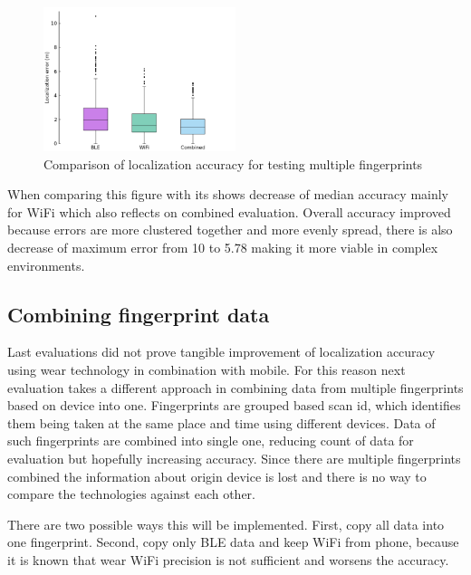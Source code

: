 \begin{figure}[h!]
	\begin{centering}
		\includegraphics[width=0.5\textwidth]{img/wknn_errors_multiple}
		\par\end{centering}
	\caption{Comparison of localization accuracy for testing multiple fingerprints}
	\label{fig07c06}
\end{figure}

When comparing this figure with  its shows decrease of median accuracy mainly for WiFi which also reflects on combined evaluation. Overall accuracy improved because errors are more clustered together and more evenly spread, there is also decrease of maximum error from 10 to 5.78 making it more viable in complex environments.

\subsection{Combining fingerprint data}\label{sec:CombiningFingerprintData}
Last evaluations did not prove tangible improvement of localization accuracy using wear technology in combination with mobile. For this reason next evaluation takes a different approach in combining data from multiple fingerprints based on device into one. Fingerprints are grouped based scan id, which identifies them being taken at the same place and time using different devices. Data of such fingerprints are combined into single one, reducing count of data for evaluation but hopefully increasing accuracy. Since there are multiple fingerprints combined the information about origin device is lost and there is no way to compare the technologies against each other.

There are two possible ways this will be implemented. First, copy all data into one fingerprint. Second, copy only BLE data and keep WiFi from phone, because it is known that wear WiFi precision is not sufficient and worsens the accuracy.

